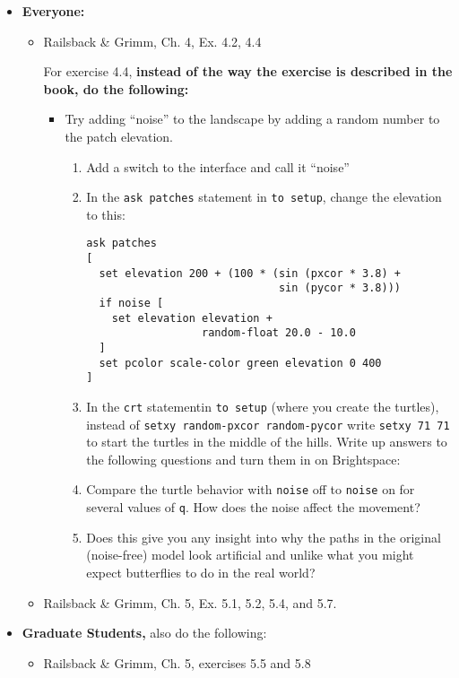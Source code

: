 \documentclass[
]{article}
\providecommand{\tightlist}{%
  \setlength{\itemsep}{0pt}\setlength{\parskip}{0pt}}
\begin{document}
\begin{itemize}
\tightlist
\item
  \textbf{Everyone:}

  \begin{itemize}
  \item
    Railsback \& Grimm, Ch. 4, Ex. 4.2, 4.4

    For exercise 4.4, \textbf{instead of the way the exercise is
    described in the book, do the following:}

    \begin{itemize}
    \tightlist
    \item
      Try adding ``noise'' to the landscape by adding a random number to
      the patch elevation.

      \begin{enumerate}
      \def\labelenumi{\arabic{enumi}.}
      \item
        Add a switch to the interface and call it ``noise''
      \item
        In the \texttt{ask\ patches} statement in \texttt{to\ setup},
        change the elevation to this:

\begin{verbatim}
ask patches
[
  set elevation 200 + (100 * (sin (pxcor * 3.8) +
                              sin (pycor * 3.8)))
  if noise [
    set elevation elevation +
                  random-float 20.0 - 10.0
  ]
  set pcolor scale-color green elevation 0 400
]
\end{verbatim}
      \item
        In the \texttt{crt} statementin \texttt{to\ setup} (where you
        create the turtles), instead of
        \texttt{setxy\ random-pxcor\ random-pycor} write
        \texttt{setxy\ 71\ 71} to start the turtles in the middle of the
        hills. Write up answers to the following questions and turn them
        in on Brightspace:
      \item
        Compare the turtle behavior with \texttt{noise} off to
        \texttt{noise} on for several values of \texttt{q}. How does the
        noise affect the movement?
      \item
        Does this give you any insight into why the paths in the
        original (noise-free) model look artificial and unlike what you
        might expect butterflies to do in the real world?
      \end{enumerate}
    \end{itemize}
  \item
    Railsback \& Grimm, Ch. 5, Ex. 5.1, 5.2, 5.4, and 5.7.
  \end{itemize}
\item
  \textbf{Graduate Students,} also do the following:

  \begin{itemize}
  \tightlist
  \item
    Railsback \& Grimm, Ch. 5, exercises 5.5 and 5.8
  \end{itemize}
\end{itemize}
\end{document}
